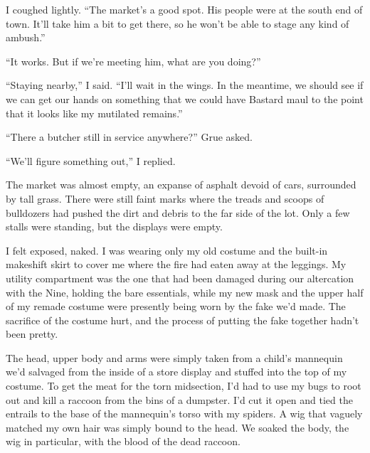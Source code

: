 I coughed lightly.  ``The market's a good spot.  His people were at the south end of town.  It'll take him a bit to get there, so he won't be able to stage any kind of ambush.''



``It works.  But if we're meeting him, what are you doing?''



``Staying nearby,'' I said.  ``I'll wait in the wings.  In the meantime, we should see if we can get our hands on something that we could have Bastard maul to the point that it looks like my mutilated remains.''



``There a butcher still in service anywhere?'' Grue asked.



``We'll figure something out,'' I replied.



\sectionbreak



The market was almost empty, an expanse of asphalt devoid of cars, surrounded by tall grass.  There were still faint marks where the treads and scoops of bulldozers had pushed the dirt and debris to the far side of the lot.  Only a few stalls were standing, but the displays were empty.



I felt exposed, naked.  I was wearing only my old costume and the built-in makeshift skirt to cover me where the fire had eaten away at the leggings.  My utility compartment was the one that had been damaged during our altercation with the Nine, holding the bare essentials, while my new mask and the upper half of my remade costume were presently being worn by the fake we'd made.  The sacrifice of the costume hurt, and the process of putting the fake together hadn't been pretty.



The head, upper body and arms were simply taken from a child's mannequin we'd salvaged from the inside of a store display and stuffed into the top of my costume.  To get the meat for the torn midsection, I'd had to use my bugs to root out and kill a raccoon from the bins of a dumpster.  I'd cut it open and tied the entrails to the base of the mannequin's torso with my spiders.  A wig that vaguely matched my own hair was simply bound to the head.  We soaked the body, the wig in particular, with the blood of the dead raccoon.



